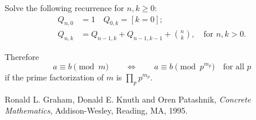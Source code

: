 \documentclass{article}
\begin{document}
Solve the following recurrence for $n,k\geq 0$:
\begin{align*}
  Q_{n,0} &= 1
  \quad Q_{0,k} = [k=0]; \\
  Q_{n,k} &= Q_{n-1,k}+Q_{n-1,k-1}+\binom{n}{k}, \quad\text{for $n,k>0$.}
\end{align*}

Therefore
\begin{equation*}
  a\equiv b\pmod{m}
  \qquad\Longleftrightarrow\qquad
  a\equiv b \pmod{p^{m_p}}\quad\text{for all $p$}
\end{equation*}
if the prime factorization of $m$ is $\prod_p p^{m_p}$.

\begin{thebibliography}{9}
    Ronald L. Graham, Donald E. Knuth and Oren Patashnik,
    \textit{Concrete Mathematics},
    Addison-Wesley, Reading, MA, 1995.
\end{thebibliography}
\end{document}
